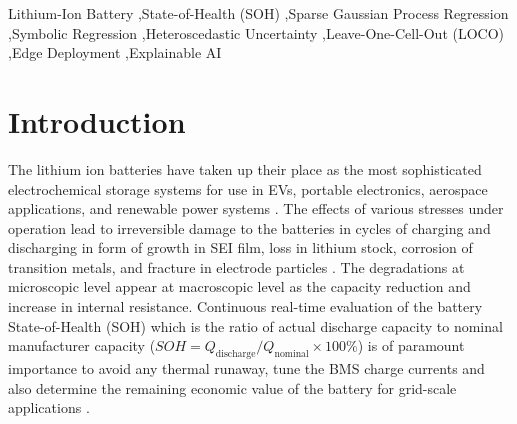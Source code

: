 \documentclass[a4paper,fleqn]{cas-sc}
\begin{document}
\begin{keywords}
Lithium-Ion Battery \sep State-of-Health (SOH) \sep Sparse Gaussian Process Regression \sep Symbolic Regression \sep Heteroscedastic Uncertainty \sep Leave-One-Cell-Out (LOCO) \sep Edge Deployment \sep Explainable AI
\end{keywords}

\maketitle

\section{Introduction}
The lithium ion batteries have taken up their place as the most sophisticated electrochemical storage systems for use in EVs, portable electronics, aerospace applications, and renewable power systems \cite{xiong2023comprehensive, tian2025recent}. The effects of various stresses under operation lead to irreversible damage to the batteries in cycles of charging and discharging in form of growth in SEI film, loss in lithium stock, corrosion of transition metals, and fracture in electrode particles \cite{he2011prognostics, saha2013comparative, wang2025tradition}. The degradations at microscopic level appear at macroscopic level as the capacity reduction and increase in internal resistance. Continuous real-time evaluation of the battery State-of-Health (SOH) which is the ratio of actual discharge capacity to nominal manufacturer capacity ($SOH = Q_{\text{discharge}} / Q_{\text{nominal}} \times 100\%$) is of paramount importance to avoid any thermal runaway, tune the BMS charge currents and also determine the remaining economic value of the battery for grid-scale applications \cite{hu2026review, zhang2022capacity}.
\end{document}
